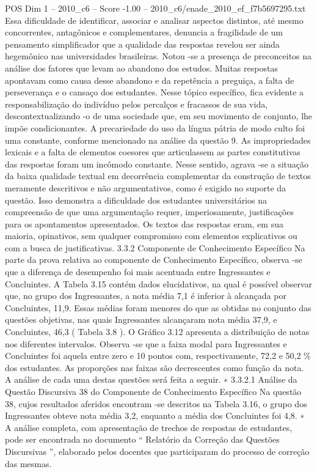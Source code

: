 \begin{textsample}{POS Dim 1 – 2010\_c6 – Score -1.00 – 2010\_c6/enade\_2010\_ef\_f7b5697295.txt}
Essa dificuldade de identificar, associar e analisar aspectos distintos, até mesmo concorrentes, antagônicos e complementares, denuncia a fragilidade de um pensamento simplificador que a qualidade das respostas revelou ser ainda hegemônico nas universidades brasileiras.
Notou -se a presença de preconceitos na análise dos fatores que levam ao abandono dos estudos.
Muitas respostas apontavam como causa desse abandono e da repetência a preguiça, a falta de perseverança e o cansaço dos estudantes.
Nesse tópico específico, fica evidente a responsabilização do indivíduo pelos percalços e fracassos de sua vida, descontextualizando -o de uma sociedade que, em seu movimento de conjunto, lhe impõe condicionantes.
A precariedade do uso da língua pátria de modo culto foi uma constante, conforme mencionado na análise da questão 9.
As impropriedades lexicais e a falta de elementos coesores que articulassem as partes constitutivas das respostas foram um incômodo constante.
Nesse sentido, agrava -se a situação da baixa qualidade textual em decorrência complementar da construção de textos meramente descritivos e não argumentativos, como é exigido no suporte da questão.
Isso demonstra a dificuldade dos estudantes universitários na compreensão de que uma argumentação requer, imperiosamente, justificações para os apontamentos apresentados.
Os textos das respostas eram, em sua maioria, opinativos, sem qualquer compromisso com elementos explicativos ou com a busca de justificativas. 3.3.2 Componente de Conhecimento Específico Na parte da prova relativa ao componente de Conhecimento Específico, observa -se que a diferença de desempenho foi mais acentuada entre Ingressantes e Concluintes.
A Tabela 3.15 contém dados elucidativos, na qual é possível observar que, no grupo dos Ingressantes, a nota média 7,1 é inferior à alcançada por Concluintes, 11,9.
Essas médias foram menores do que as obtidas no conjunto das questões objetivas, nas quais Ingressantes alcançaram nota média 37,9, e Concluintes, 46,3 ( Tabela 3.8 ).
O Gráfico 3.12 apresenta a distribuição de notas nos diferentes intervalos.
Observa -se que a faixa modal para Ingressantes e Concluintes foi aquela entre zero e 10 pontos com, respectivamente, 72,2 e 50,2 \% dos estudantes.
As proporções nas faixas são decrescentes como função da nota.
A análise de cada uma destas questões será feita a seguir. ∗ 3.3.2.1 Análise da Questão Discursiva 38 do Componente de Conhecimento Específico Na questão 38, cujos resultados aferidos encontram -se descritos na Tabela 3.16, o grupo dos Ingressantes obteve nota média 3,2, enquanto a média dos Concluintes foi 4,8. ∗ A análise completa, com apresentação de trechos de respostas de estudantes, pode ser encontrada no documento “ Relatório da Correção das Questões Discursivas ”, elaborado pelos docentes que participaram do processo de correção das mesmas.

\end{textsample}
